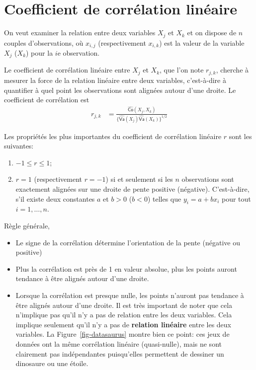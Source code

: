 \documentclass[
  11pt,
  letterpaper,
]{scrbook}
\providecommand{\tightlist}{%
  \setlength{\itemsep}{0pt}\setlength{\parskip}{0pt}}\usepackage{longtable,booktabs,array}
\theoremstyle{definition}
\theoremstyle{remark}
\begin{document}
\section{Coefficient de corrélation
linéaire}\label{coefficient-de-corruxe9lation-linuxe9aire}

On veut examiner la relation entre deux variables \(X_j\) et \(X_k\) et
on dispose de \(n\) couples d'observations, où \(x_{i, j}\)
(respectivement \(x_{i, k}\)) est la valeur de la variable \(X_j\)
(\(X_k\)) pour la \(i\)e observation.

Le coefficient de corrélation linéaire entre \(X_j\) et \(X_k\), que
l'on note \(r_{j, k}\), cherche à mesurer la force de la relation
linéaire entre deux variables, c'est-à-dire à quantifier à quel point
les observations sont alignées autour d'une droite. Le coefficient de
corrélation est \begin{align*}
r_{j, k} &= \frac{\widehat{\mathsf{Co}}(X_j, X_k)}{\{\widehat{\mathsf{Va}}(X_j) \widehat{\mathsf{Va}}(X_k)\}^{1/2}} 
\end{align*}

Les propriétés les plus importantes du coefficient de corrélation
linéaire \(r\) sont les suivantes:

\begin{enumerate}
\def\labelenumi{\arabic{enumi})}
\tightlist
\item
  \(-1 \leq r \leq 1\);
\item
  \(r=1\) (respectivement \(r=-1\)) si et seulement si les \(n\)
  observations sont exactement alignées sur une droite de pente positive
  (négative). C'est-à-dire, s'il existe deux constantes \(a\) et \(b>0\)
  (\(b<0\)) telles que \(y_i=a+b x_i\) pour tout \(i=1, \ldots, n\).
\end{enumerate}

Règle générale,

\begin{itemize}
\tightlist
\item
  Le signe de la corrélation détermine l'orientation de la pente
  (négative ou positive)
\item
  Plus la corrélation est près de 1 en valeur absolue, plus les points
  auront tendance à être alignés autour d'une droite.
\item
  Lorsque la corrélation est presque nulle, les points n'auront pas
  tendance à être alignés autour d'une droite. Il est très important de
  noter que cela n'implique pas qu'il n'y a pas de relation entre les
  deux variables. Cela implique seulement qu'il n'y a pas de
  \textbf{relation linéaire} entre les deux variables. La
  Figure~\ref{fig-datasaurus} montre bien ce point: ces jeux de données
  ont la même corrélation linéaire (quasi-nulle), mais ne sont
  clairement pas indépendantes puisqu'elles permettent de dessiner un
  dinosaure ou une étoile.
\end{itemize}
\end{document}
